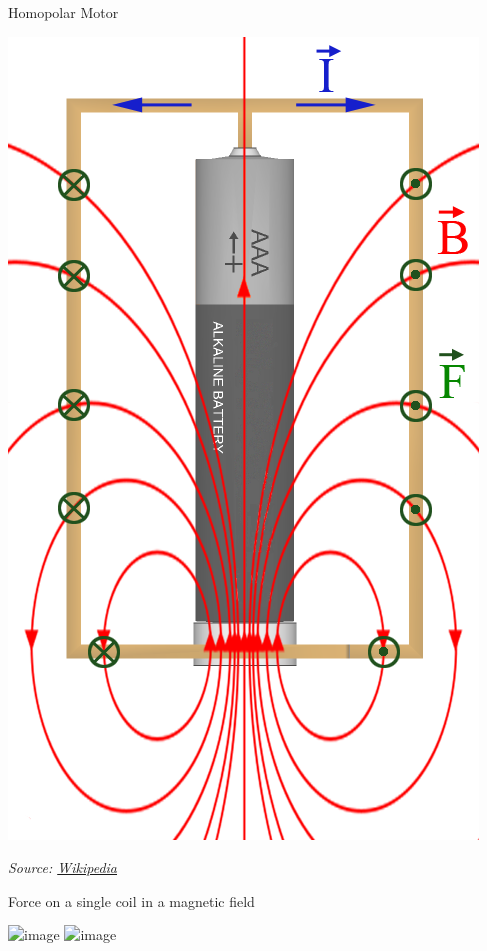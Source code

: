 \documentclass[compress]{beamer}
\newcommand{\source}[2]{{\tiny\it Source: \href{#1}{#2}}}
\begin{document}
\begin{frame}{Homopolar Motor}
\begin{center}
        \includegraphics[height=0.6\paperheight]{image11}
    \end{center}

    \source{https://en.wikipedia.org/wiki/Homopolar_motor}{Wikipedia}
\end{frame}

\begin{frame}{Force on a single coil in a magnetic field}

    \begin{center}
        \includegraphics<1>[width=0.8\linewidth]{conductor-in-magnetic-field-1}
        \includegraphics<2>[width=0.8\linewidth]{conductor-in-magnetic-field-2}
    \end{center}
\end{frame}
\end{document}
